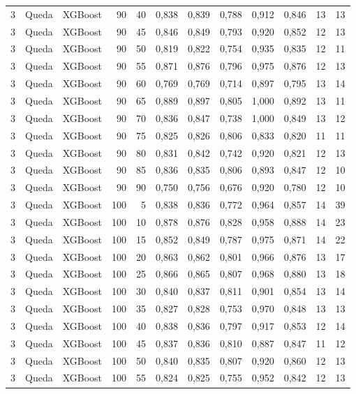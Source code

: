 \begin{longtable}{@{}rllrrrrrrrrr@{}}
3 & Queda & XGBoost & 90 & 40 & 0,838 & 0,839 & 0,788 & 0,912 & 0,846 & 13 & 13 \\
3 & Queda & XGBoost & 90 & 45 & 0,846 & 0,849 & 0,793 & 0,920 & 0,852 & 12 & 13 \\
3 & Queda & XGBoost & 90 & 50 & 0,819 & 0,822 & 0,754 & 0,935 & 0,835 & 12 & 11 \\
3 & Queda & XGBoost & 90 & 55 & 0,871 & 0,876 & 0,796 & 0,975 & 0,876 & 12 & 13 \\
3 & Queda & XGBoost & 90 & 60 & 0,769 & 0,769 & 0,714 & 0,897 & 0,795 & 13 & 14 \\
3 & Queda & XGBoost & 90 & 65 & 0,889 & 0,897 & 0,805 & 1,000 & 0,892 & 13 & 11 \\
3 & Queda & XGBoost & 90 & 70 & 0,836 & 0,847 & 0,738 & 1,000 & 0,849 & 13 & 12 \\
3 & Queda & XGBoost & 90 & 75 & 0,825 & 0,826 & 0,806 & 0,833 & 0,820 & 11 & 11 \\
3 & Queda & XGBoost & 90 & 80 & 0,831 & 0,842 & 0,742 & 0,920 & 0,821 & 12 & 13 \\
3 & Queda & XGBoost & 90 & 85 & 0,836 & 0,835 & 0,806 & 0,893 & 0,847 & 12 & 10 \\
3 & Queda & XGBoost & 90 & 90 & 0,750 & 0,756 & 0,676 & 0,920 & 0,780 & 12 & 10 \\
3 & Queda & XGBoost & 100 & 5 & 0,838 & 0,836 & 0,772 & 0,964 & 0,857 & 14 & 39 \\
3 & Queda & XGBoost & 100 & 10 & 0,878 & 0,876 & 0,828 & 0,958 & 0,888 & 14 & 23 \\
3 & Queda & XGBoost & 100 & 15 & 0,852 & 0,849 & 0,787 & 0,975 & 0,871 & 14 & 22 \\
3 & Queda & XGBoost & 100 & 20 & 0,863 & 0,862 & 0,801 & 0,966 & 0,876 & 13 & 17 \\
3 & Queda & XGBoost & 100 & 25 & 0,866 & 0,865 & 0,807 & 0,968 & 0,880 & 13 & 18 \\
3 & Queda & XGBoost & 100 & 30 & 0,840 & 0,837 & 0,811 & 0,901 & 0,854 & 13 & 14 \\
3 & Queda & XGBoost & 100 & 35 & 0,827 & 0,828 & 0,753 & 0,970 & 0,848 & 13 & 13 \\
3 & Queda & XGBoost & 100 & 40 & 0,838 & 0,836 & 0,797 & 0,917 & 0,853 & 12 & 14 \\
3 & Queda & XGBoost & 100 & 45 & 0,837 & 0,836 & 0,810 & 0,887 & 0,847 & 11 & 12 \\
3 & Queda & XGBoost & 100 & 50 & 0,840 & 0,835 & 0,807 & 0,920 & 0,860 & 12 & 13 \\
3 & Queda & XGBoost & 100 & 55 & 0,824 & 0,825 & 0,755 & 0,952 & 0,842 & 12 & 13 \\

\end{longtable}
